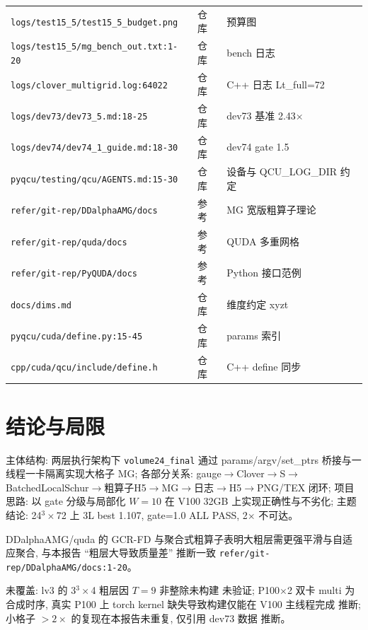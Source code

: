 \documentclass[UTF8]{ctexart}
\begin{document}
\begin{xltabular}{\textwidth}{llX}
\texttt{\nolinkurl{logs/test15_5/test15_5_budget.png}} & 仓库 & 预算图 \\
\texttt{\nolinkurl{logs/test15_5/mg_bench_out.txt:1-20}} & 仓库 & bench 日志 \\
\texttt{\nolinkurl{logs/clover_multigrid.log:64022}} & 仓库 & C++ 日志 Lt\_full=72 \\
\texttt{\nolinkurl{logs/dev73/dev73_5.md:18-25}} & 仓库 & dev73 基准 2.43$\times$ \\
\texttt{\nolinkurl{logs/dev74/dev74_1_guide.md:18-30}} & 仓库 & dev74 gate 1.5 \\
\texttt{\nolinkurl{pyqcu/testing/qcu/AGENTS.md:15-30}} & 仓库 & 设备与 QCU\_LOG\_DIR 约定 \\
\texttt{\nolinkurl{refer/git-rep/DDalphaAMG/docs}} & 参考 & MG 宽版粗算子理论 \\
\texttt{\nolinkurl{refer/git-rep/quda/docs}} & 参考 & QUDA 多重网格 \\
\texttt{\nolinkurl{refer/git-rep/PyQUDA/docs}} & 参考 & Python 接口范例 \\
\texttt{\nolinkurl{docs/dims.md}} & 仓库 & 维度约定 xyzt \\
\texttt{\nolinkurl{pyqcu/cuda/define.py:15-45}} & 仓库 & params 索引 \\
\texttt{\nolinkurl{cpp/cuda/qcu/include/define.h}} & 仓库 & C++ define 同步 \\
\bottomrule
\end{xltabular}

\section{结论与局限}
\begin{conclbox}
主体结构: 两层执行架构下 \texttt{\nolinkurl{volume24_final}} 通过 params/argv/set\_ptrs 桥接与一线程一卡隔离实现大格子 MG; 各部分关系: gauge$\to$Clover$\to$S$\to$BatchedLocalSchur$\to$粗算子H5$\to$MG$\to$日志$\to$H5$\to$PNG/TEX 闭环; 项目思路: 以 gate 分级与局部化 $W=10$ 在 V100 32GB 上实现正确性与不劣化; 主题结论: 24$^3\times$72 上 3L best 1.107, gate=1.0 ALL PASS, 2$\times$ 不可达。
\end{conclbox}
\begin{refbox}
DDalphaAMG/quda 的 GCR-FD 与聚合式粗算子表明大粗层需更强平滑与自适应聚合, 与本报告 ``粗层大导致质量差'' 推断一致 \textcolor{evidence}{\texttt{\nolinkurl{refer/git-rep/DDalphaAMG/docs:1-20}}}。
\end{refbox}
\begin{warnbox}
未覆盖: lv3 的 3$^3\times$4 粗层因 $T=9$ 非整除未构建 \textcolor{warn}{未验证}; P100$\times$2 双卡 multi 为合成时序, 真实 P100 上 torch kernel 缺失导致构建仅能在 V100 主线程完成 \textcolor{warn}{推断}; 小格子 $>2\times$ 的复现在本报告未重复, 仅引用 dev73 数据 \textcolor{warn}{推断}。
\end{warnbox}
\end{document}
